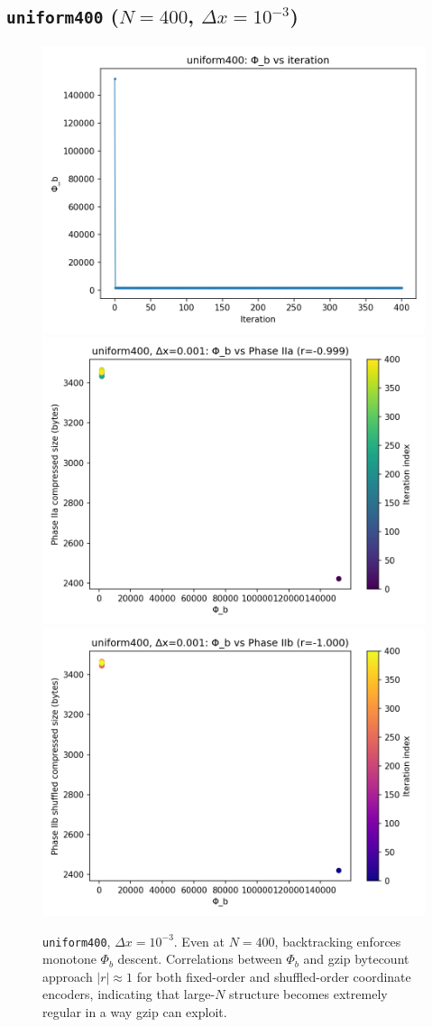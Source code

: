 \documentclass[11pt,a4paper]{article}
\newcommand{\phib}{\Phi_b}
\begin{document}
\subsection*{\texttt{uniform400} ($N{=}400$, $\Delta x = 10^{-3}$)}
\begin{figure}[htbp]
\centering
\includegraphics[width=0.32\linewidth]{figures/uniform400_dx0.001_phib_vs_iter.png}
\includegraphics[width=0.32\linewidth]{figures/uniform400_dx0.001_phib_vs_phase2a.png}
\includegraphics[width=0.32\linewidth]{figures/uniform400_dx0.001_phib_vs_phase2b.png}
\caption{\texttt{uniform400}, $\Delta x{=}10^{-3}$. Even at $N{=}400$, backtracking enforces monotone $\phib$ descent. Correlations between $\phib$ and gzip bytecount approach $|r|\approx 1$ for both fixed-order and shuffled-order coordinate encoders, indicating that large-$N$ structure becomes extremely regular in a way gzip can exploit.}
\label{fig:uniform400}
\end{figure}
\end{document}
